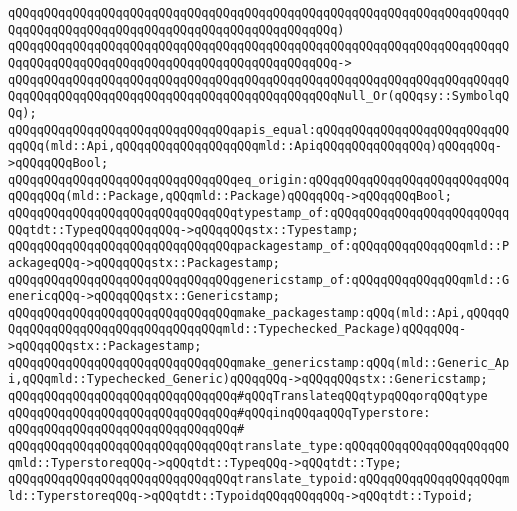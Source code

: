 \verb|qQQqqQQqqQQqqQQqqQQqqQQqqQQqqQQqqQQqqQQqqQQqqQQqqQQqqQQqqQQqqQQqqQQqqQQqqQQqqQQqqQQqqQQqqQQqqQQqqQQqqQQqqQQqqQQqqQQq)|\newline
\verb|qQQqqQQqqQQqqQQqqQQqqQQqqQQqqQQqqQQqqQQqqQQqqQQqqQQqqQQqqQQqqQQqqQQqqQQqqQQqqQQqqQQqqQQqqQQqqQQqqQQqqQQqqQQqqQQqqQQq->|\newline
\verb|qQQqqQQqqQQqqQQqqQQqqQQqqQQqqQQqqQQqqQQqqQQqqQQqqQQqqQQqqQQqqQQqqQQqqQQqqQQqqQQqqQQqqQQqqQQqqQQqqQQqqQQqqQQqqQQqqQQqNull_Or(qQQqsy::SymbolqQQq);|\newline
\newline
\verb|qQQqqQQqqQQqqQQqqQQqqQQqqQQqqQQqapis_equal:qQQqqQQqqQQqqQQqqQQqqQQqqQQqqQQq(mld::Api,qQQqqQQqqQQqqQQqqQQqmld::ApiqQQqqQQqqQQqqQQq)qQQqqQQq->qQQqqQQqBool;|\newline
\verb|qQQqqQQqqQQqqQQqqQQqqQQqqQQqqQQqeq_origin:qQQqqQQqqQQqqQQqqQQqqQQqqQQqqQQqqQQq(mld::Package,qQQqmld::Package)qQQqqQQq->qQQqqQQqBool;|\newline
\newline
\verb|qQQqqQQqqQQqqQQqqQQqqQQqqQQqqQQqtypestamp_of:qQQqqQQqqQQqqQQqqQQqqQQqqQQqtdt::TypeqQQqqQQqqQQq->qQQqqQQqstx::Typestamp;|\newline
\verb|qQQqqQQqqQQqqQQqqQQqqQQqqQQqqQQqpackagestamp_of:qQQqqQQqqQQqqQQqmld::PackageqQQq->qQQqqQQqstx::Packagestamp;|\newline
\verb|qQQqqQQqqQQqqQQqqQQqqQQqqQQqqQQqgenericstamp_of:qQQqqQQqqQQqqQQqmld::GenericqQQq->qQQqqQQqstx::Genericstamp;|\newline
\newline
\verb|qQQqqQQqqQQqqQQqqQQqqQQqqQQqqQQqmake_packagestamp:qQQq(mld::Api,qQQqqQQqqQQqqQQqqQQqqQQqqQQqqQQqqQQqmld::Typechecked_Package)qQQqqQQq->qQQqqQQqstx::Packagestamp;|\newline
\verb|qQQqqQQqqQQqqQQqqQQqqQQqqQQqqQQqmake_genericstamp:qQQq(mld::Generic_Api,qQQqmld::Typechecked_Generic)qQQqqQQq->qQQqqQQqstx::Genericstamp;|\newline
\newline
\verb|qQQqqQQqqQQqqQQqqQQqqQQqqQQqqQQq#qQQqTranslateqQQqtypqQQqorqQQqtype|\newline
\verb|qQQqqQQqqQQqqQQqqQQqqQQqqQQqqQQq#qQQqinqQQqaqQQqTyperstore:|\newline
\verb|qQQqqQQqqQQqqQQqqQQqqQQqqQQqqQQq#|\newline
\verb|qQQqqQQqqQQqqQQqqQQqqQQqqQQqqQQqtranslate_type:qQQqqQQqqQQqqQQqqQQqqQQqmld::TyperstoreqQQq->qQQqtdt::TypeqQQq->qQQqtdt::Type;|\newline
\verb|qQQqqQQqqQQqqQQqqQQqqQQqqQQqqQQqtranslate_typoid:qQQqqQQqqQQqqQQqqQQqmld::TyperstoreqQQq->qQQqtdt::TypoidqQQqqQQqqQQq->qQQqtdt::Typoid;|\newline
